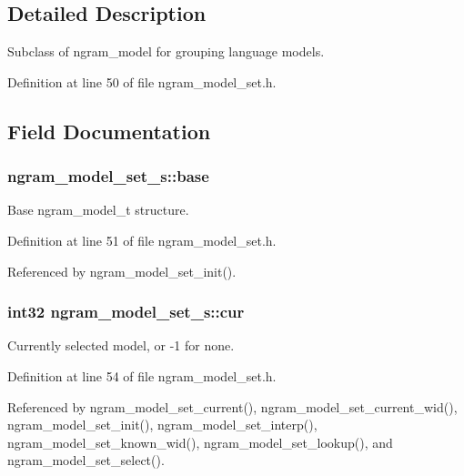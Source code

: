 \subsection{Detailed Description}
Subclass of ngram\+\_\+model for grouping language models. 

Definition at line 50 of file ngram\+\_\+model\+\_\+set.\+h.



\subsection{Field Documentation}
\subsubsection[{base}]{ ngram\+\_\+model\+\_\+set\+\_\+s\+::base}\label{structngram__model__set__s_a3b88f17aa148ceac4f32dd4cbf5f4f81}


Base ngram\+\_\+model\+\_\+t structure. 



Definition at line 51 of file ngram\+\_\+model\+\_\+set.\+h.



Referenced by ngram\+\_\+model\+\_\+set\+\_\+init().

\subsubsection[{cur}]{\setlength{\rightskip}{0pt plus 5cm}int32 ngram\+\_\+model\+\_\+set\+\_\+s\+::cur}\label{structngram__model__set__s_a031e7d7dcf1667f69e1cb980f45623cb}


Currently selected model, or -\/1 for none. 



Definition at line 54 of file ngram\+\_\+model\+\_\+set.\+h.



Referenced by ngram\+\_\+model\+\_\+set\+\_\+current(), ngram\+\_\+model\+\_\+set\+\_\+current\+\_\+wid(), ngram\+\_\+model\+\_\+set\+\_\+init(), ngram\+\_\+model\+\_\+set\+\_\+interp(), ngram\+\_\+model\+\_\+set\+\_\+known\+\_\+wid(), ngram\+\_\+model\+\_\+set\+\_\+lookup(), and ngram\+\_\+model\+\_\+set\+\_\+select().

